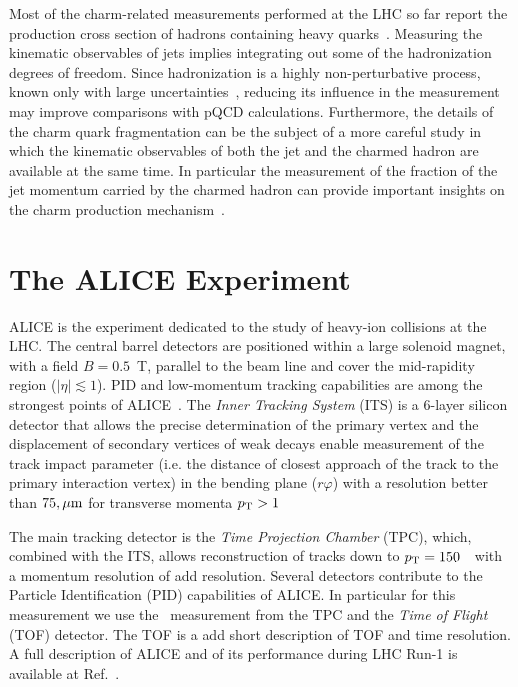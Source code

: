 \documentclass[a4paper]{jpconf}
\begin{document}
Most of the charm-related measurements performed at the LHC so far report the production cross section of hadrons
containing heavy quarks~\cite{ALICE:2012d, ALICE:2012e, ATLAS:2012e, LHCb:2013a, ALICE:2014d, ATLAS:2014e, ALICE:2015c, ALICE:2015d, ALICE:2016a, ATLAS:2016a}.
Measuring the kinematic observables of jets implies integrating out some of the hadronization degrees of freedom. 
Since hadronization is a highly non-perturbative process, known only with large uncertainties~\cite{dEnterria:2014}, 
reducing its influence in the measurement may improve comparisons with pQCD calculations.
Furthermore, the details of the charm quark fragmentation can be the subject of a more careful study in which the kinematic observables 
of both the jet and the charmed hadron are available at the same time. In particular the measurement of the fraction of the jet momentum carried 
by the charmed hadron can provide important insights on the charm production mechanism~\cite{CDF:1990, UA1:1990, STAR:2009a, ATLAS:2012d}.

\section{The ALICE Experiment}
ALICE is the experiment dedicated to the study of heavy-ion collisions at the LHC.
The central barrel detectors are positioned within a large solenoid magnet, with a
field $B = 0.5$~T, parallel to the beam line and cover the mid-rapidity region ($\lvert \eta\rvert \lesssim 1$).
PID and low-momentum tracking capabilities are among the strongest points of ALICE~\cite{ALICE:2014b}.
The \emph{Inner Tracking System} (ITS) is a 6-layer silicon detector that allows the precise determination of the primary vertex and the displacement of 
secondary vertices of weak decays  enable measurement of the track impact parameter (i.e. the distance of
closest approach of the track to the primary interaction vertex) in the bending plane ($r\varphi$) with a resolution
better than $75, \rm \mu m$ for transverse momenta $p_{\rm T} > 1$~\GeVc 

The main tracking detector is the \emph{Time Projection Chamber} (TPC), which, combined with the ITS, allows reconstruction of tracks down to $p_{\rm T}=150$~\GeVc\ with a momentum resolution
of {\color{red} add resolution}. Several detectors contribute to the Particle Identification (PID) capabilities of ALICE. In particular for this measurement we use the \dedx\ measurement from the TPC and
the \emph{Time of Flight} (TOF) detector. The TOF is a {\color{red} add short description of TOF and time resolution}.
A full description of ALICE and of its performance during LHC Run-1 is available at Ref.~\cite{ALICE:2014b}.
\end{document}
